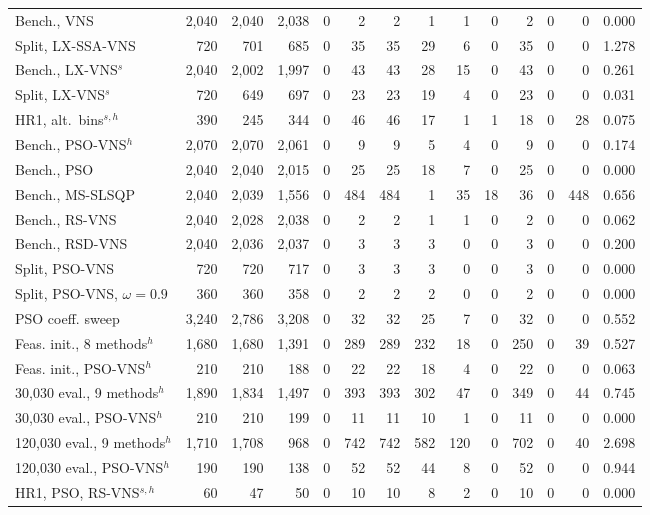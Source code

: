 \begin{table}[!htbp]
\begin{tabular}{lrrrrrrrrrrrrr}
Bench., VNS & 2,040 & 2,040 & 2,038 & 0 & 2 & 2 & 1 & 1 & 0 & 2 & 0 & 0 & 0.000 \\
Split, LX-SSA-VNS & 720 & 701 & 685 & 0 & 35 & 35 & 29 & 6 & 0 & 35 & 0 & 0 & 1.278 \\
Bench., LX-VNS$^s$ & 2,040 & 2,002 & 1,997 & 0 & 43 & 43 & 28 & 15 & 0 & 43 & 0 & 0 & 0.261 \\
Split, LX-VNS$^s$ & 720 & 649 & 697 & 0 & 23 & 23 & 19 & 4 & 0 & 23 & 0 & 0 & 0.031 \\
HR1, alt.\ bins$^{s,h}$ & 390 & 245 & 344 & 0 & 46 & 46 & 17 & 1 & 1 & 18 & 0 & 28 & 0.075 \\
Bench., PSO-VNS$^h$ & 2,070 & 2,070 & 2,061 & 0 & 9 & 9 & 5 & 4 & 0 & 9 & 0 & 0 & 0.174 \\
Bench., PSO & 2,040 & 2,040 & 2,015 & 0 & 25 & 25 & 18 & 7 & 0 & 25 & 0 & 0 & 0.000 \\
Bench., MS-SLSQP & 2,040 & 2,039 & 1,556 & 0 & 484 & 484 & 1 & 35 & 18 & 36 & 0 & 448 & 0.656 \\
Bench., RS-VNS & 2,040 & 2,028 & 2,038 & 0 & 2 & 2 & 1 & 1 & 0 & 2 & 0 & 0 & 0.062 \\
Bench., RSD-VNS & 2,040 & 2,036 & 2,037 & 0 & 3 & 3 & 3 & 0 & 0 & 3 & 0 & 0 & 0.200 \\
Split, PSO-VNS & 720 & 720 & 717 & 0 & 3 & 3 & 3 & 0 & 0 & 3 & 0 & 0 & 0.000 \\
Split, PSO-VNS, $\omega=0.9$ & 360 & 360 & 358 & 0 & 2 & 2 & 2 & 0 & 0 & 2 & 0 & 0 & 0.000 \\
PSO coeff. sweep & 3,240 & 2,786 & 3,208 & 0 & 32 & 32 & 25 & 7 & 0 & 32 & 0 & 0 & 0.552 \\
Feas. init., 8 methods$^h$ & 1,680 & 1,680 & 1,391 & 0 & 289 & 289 & 232 & 18 & 0 & 250 & 0 & 39 & 0.527 \\
Feas. init., PSO-VNS$^h$ & 210 & 210 & 188 & 0 & 22 & 22 & 18 & 4 & 0 & 22 & 0 & 0 & 0.063 \\
30,030 eval., 9 methods$^h$ & 1,890 & 1,834 & 1,497 & 0 & 393 & 393 & 302 & 47 & 0 & 349 & 0 & 44 & 0.745 \\
30,030 eval., PSO-VNS$^h$ & 210 & 210 & 199 & 0 & 11 & 11 & 10 & 1 & 0 & 11 & 0 & 0 & 0.000 \\
120,030 eval., 9 methods$^h$ & 1,710 & 1,708 & 968 & 0 & 742 & 742 & 582 & 120 & 0 & 702 & 0 & 40 & 2.698 \\
120,030 eval., PSO-VNS$^h$ & 190 & 190 & 138 & 0 & 52 & 52 & 44 & 8 & 0 & 52 & 0 & 0 & 0.944 \\
HR1, PSO, RS-VNS$^{s,h}$ & 60 & 47 & 50 & 0 & 10 & 10 & 8 & 2 & 0 & 10 & 0 & 0 & 0.000 \\

\end{tabular}
\end{table}
